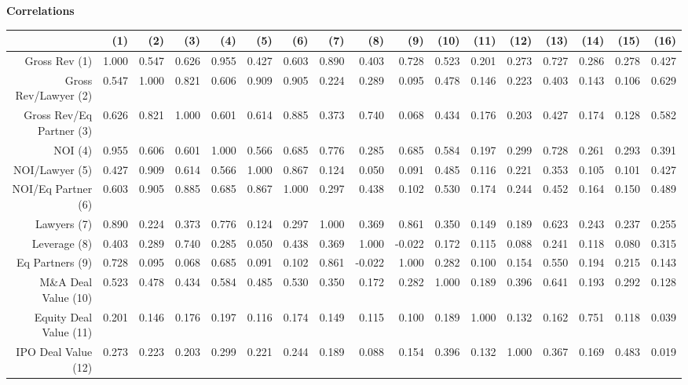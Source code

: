 \documentclass{article}
\begin{document}
\newpage
{\large \textbf{Correlations} }%
\begin{table}[H]
\centering
\begin{tabular}{rrrrrrrrrrrrrrrrr}
  \hline
 & (1) & (2) & (3) & (4) & (5) & (6) & (7) & (8) & (9) & (10) & (11) & (12) & (13) & (14) & (15) & (16) \\ 
  \hline
Gross Rev (1) & 1.000 & 0.547 & 0.626 & 0.955 & 0.427 & 0.603 & 0.890 & 0.403 & 0.728 & 0.523 & 0.201 & 0.273 & 0.727 & 0.286 & 0.278 & 0.427 \\ 
  Gross Rev/Lawyer (2) & 0.547 & 1.000 & 0.821 & 0.606 & 0.909 & 0.905 & 0.224 & 0.289 & 0.095 & 0.478 & 0.146 & 0.223 & 0.403 & 0.143 & 0.106 & 0.629 \\ 
  Gross Rev/Eq Partner (3) & 0.626 & 0.821 & 1.000 & 0.601 & 0.614 & 0.885 & 0.373 & 0.740 & 0.068 & 0.434 & 0.176 & 0.203 & 0.427 & 0.174 & 0.128 & 0.582 \\ 
  NOI (4) & 0.955 & 0.606 & 0.601 & 1.000 & 0.566 & 0.685 & 0.776 & 0.285 & 0.685 & 0.584 & 0.197 & 0.299 & 0.728 & 0.261 & 0.293 & 0.391 \\ 
  NOI/Lawyer (5) & 0.427 & 0.909 & 0.614 & 0.566 & 1.000 & 0.867 & 0.124 & 0.050 & 0.091 & 0.485 & 0.116 & 0.221 & 0.353 & 0.105 & 0.101 & 0.427 \\ 
  NOI/Eq Partner (6) & 0.603 & 0.905 & 0.885 & 0.685 & 0.867 & 1.000 & 0.297 & 0.438 & 0.102 & 0.530 & 0.174 & 0.244 & 0.452 & 0.164 & 0.150 & 0.489 \\ 
  Lawyers (7) & 0.890 & 0.224 & 0.373 & 0.776 & 0.124 & 0.297 & 1.000 & 0.369 & 0.861 & 0.350 & 0.149 & 0.189 & 0.623 & 0.243 & 0.237 & 0.255 \\ 
  Leverage (8) & 0.403 & 0.289 & 0.740 & 0.285 & 0.050 & 0.438 & 0.369 & 1.000 & -0.022 & 0.172 & 0.115 & 0.088 & 0.241 & 0.118 & 0.080 & 0.315 \\ 
  Eq Partners (9) & 0.728 & 0.095 & 0.068 & 0.685 & 0.091 & 0.102 & 0.861 & -0.022 & 1.000 & 0.282 & 0.100 & 0.154 & 0.550 & 0.194 & 0.215 & 0.143 \\ 
  M\&A Deal Value (10) & 0.523 & 0.478 & 0.434 & 0.584 & 0.485 & 0.530 & 0.350 & 0.172 & 0.282 & 1.000 & 0.189 & 0.396 & 0.641 & 0.193 & 0.292 & 0.128 \\ 
  Equity Deal Value (11) & 0.201 & 0.146 & 0.176 & 0.197 & 0.116 & 0.174 & 0.149 & 0.115 & 0.100 & 0.189 & 1.000 & 0.132 & 0.162 & 0.751 & 0.118 & 0.039 \\ 
  IPO Deal Value (12) & 0.273 & 0.223 & 0.203 & 0.299 & 0.221 & 0.244 & 0.189 & 0.088 & 0.154 & 0.396 & 0.132 & 1.000 & 0.367 & 0.169 & 0.483 & 0.019 \\ 

\end{tabular}
\end{table}
\end{document}
